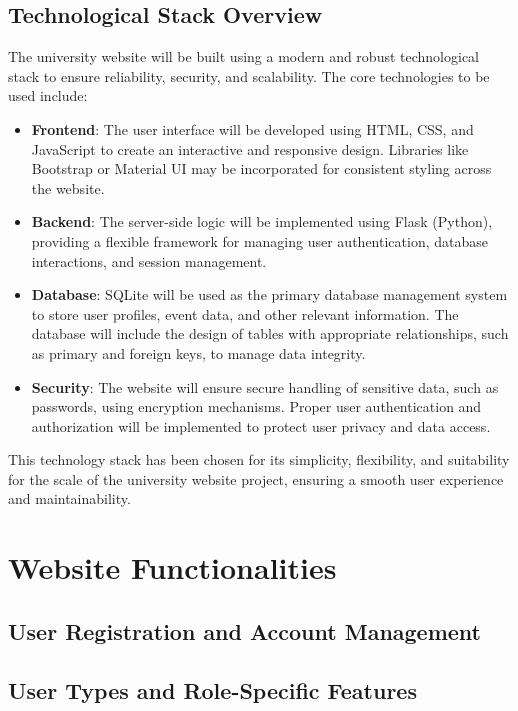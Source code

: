 \documentclass[12pt]{article}
\begin{document}
\subsection{Technological Stack Overview}
The university website will be built using a modern and robust technological stack to ensure reliability, security, and scalability. 
The core technologies to be used include:
\begin{itemize}
    \item \textbf{Frontend}: The user interface will be developed using HTML, CSS, and JavaScript to create an interactive and
     responsive design. Libraries like Bootstrap or Material UI may be incorporated for consistent styling across the website.
    \item \textbf{Backend}: The server-side logic will be implemented using Flask (Python), providing a flexible framework for 
    managing user authentication, database interactions, and session management.
    \item \textbf{Database}: SQLite will be used as the primary database management system to store user profiles, event data, 
    and other relevant information. The database will include the design of tables with appropriate relationships, such as primary
     and foreign keys, to manage data integrity.
    \item \textbf{Security}: The website will ensure secure handling of sensitive data, such as passwords, using encryption 
    mechanisms. Proper user authentication and authorization will be implemented to protect user privacy and data access.
\end{itemize}
This technology stack has been chosen for its simplicity, flexibility, and suitability for the scale of the university website project, 
ensuring a smooth user experience and maintainability.

\newpage
\section{Website Functionalities}
\subsection{User Registration and Account Management}
\subsection{User Types and Role-Specific Features}
\end{document}
